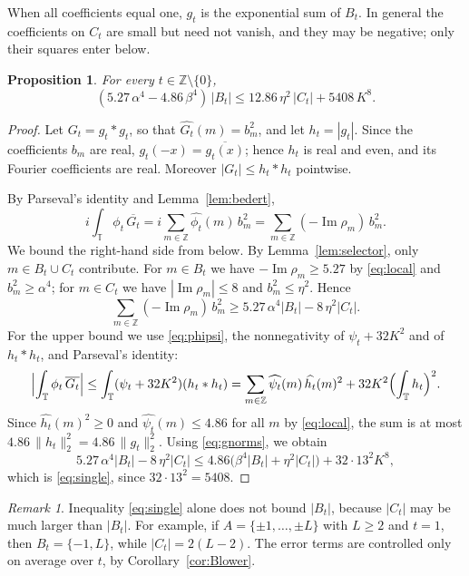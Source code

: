 \documentclass{amsart}
\newtheorem{proposition}[theorem]{Proposition}
\theoremstyle{remark}
\newtheorem{remark}[theorem]{Remark}
\numberwithin{equation}{section}
\numberwithin{table}{section}
\newcommand{\T}{\mathbb{T}}
\newcommand{\Z}{\mathbb{Z}}
\DeclareMathOperator{\im}{Im}
\begin{document}
When all coefficients equal one, $g_t$ is the exponential sum of $B_t$. In general the coefficients on $C_t$ are small but need not vanish, and they may be negative; only their squares enter below.

\begin{proposition}\label{prop:single}
For every $t\in\Z\setminus\{0\}$,
\begin{equation}\label{eq:single}
(5.27\,\alpha^4-4.86\,\beta^4)\,|B_t|\le12.86\,\eta^2\,|C_t|+5408\,K^8.
\end{equation}
\end{proposition}

\begin{proof}
Let $G_t=g_t*g_t$, so that $\widehat{G_t}(m)=b_m^2$, and let $h_t=|g_t|$. Since the coefficients $b_m$ are real, $g_t(-x)=\overline{g_t(x)}$; hence $h_t$ is real and even, and its Fourier coefficients are real. Moreover $|G_t|\le h_t*h_t$ pointwise.

By Parseval's identity and Lemma~\ref{lem:bedert},
\[
i\int_\T\phi_t\,\overline{G_t}=i\sum_{m\in\Z}\widehat{\phi_t}(m)\,b_m^2=\sum_{m\in\Z}(-\im\rho_m)\,b_m^2.
\]
We bound the right-hand side from below. By Lemma~\ref{lem:selector}, only $m\in B_t\cup C_t$ contribute. For $m\in B_t$ we have $-\im\rho_m\ge5.27$ by \eqref{eq:local} and $b_m^2\ge\alpha^4$; for $m\in C_t$ we have $|\im\rho_m|\le8$ and $b_m^2\le\eta^2$. Hence
\[
\sum_{m\in\Z}(-\im\rho_m)\,b_m^2\ge5.27\,\alpha^4|B_t|-8\,\eta^2|C_t|.
\]
For the upper bound we use \eqref{eq:phipsi}, the nonnegativity of $\psi_t+32K^2$ and of $h_t*h_t$, and Parseval's identity:
\[
\Bigl|\int_\T\phi_t\,\overline{G_t}\Bigr|\le\int_\T(\psi_t+32K^2)(h_t*h_t)
=\sum_{m\in\Z}\widehat{\psi_t}(m)\,\widehat{h_t}(m)^2+32K^2\Bigl(\int_\T h_t\Bigr)^2.
\]
Since $\widehat{h_t}(m)^2\ge0$ and $\widehat{\psi_t}(m)\le4.86$ for all $m$ by \eqref{eq:local}, the sum is at most $4.86\,\|h_t\|_2^2=4.86\,\|g_t\|_2^2$. Using \eqref{eq:gnorms}, we obtain
\[
5.27\,\alpha^4|B_t|-8\,\eta^2|C_t|\le4.86\bigl(\beta^4|B_t|+\eta^2|C_t|\bigr)+32\cdot13^2K^8,
\]
which is \eqref{eq:single}, since $32\cdot13^2=5408$.
\end{proof}

\begin{remark}\label{rem:single}
Inequality \eqref{eq:single} alone does not bound $|B_t|$, because $|C_t|$ may be much larger than $|B_t|$. For example, if $A=\{\pm1,\dots,\pm L\}$ with $L\ge2$ and $t=1$, then $B_t=\{-1,L\}$, while $|C_t|=2(L-2)$. The error terms are controlled only on average over $t$, by Corollary~\ref{cor:Blower}.
\end{remark}
\end{document}
